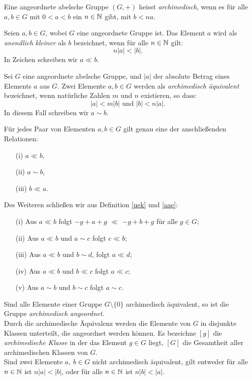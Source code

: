 %
\begin{defn}\label{archim}
Eine angeordnete abelsche Gruppe $\left(G,+\right)$ heisst \textit{archimedisch}, wenn es für alle $a, b \in G$  mit $0 < a < b$ ein $n \in \mathbb{N} $ gibt, mit $b < na$.
\end{defn}
%
%
\begin{defn}\label{uek}
Seien $a, b \in G$, wobei $G$ eine angeordnete Gruppe ist. Das Element $a$ wird als \textit{unendlich kleiner} als $b$ bezeichnet, wenn für alle $  n \in \mathbb{N} $ gilt: 
\[n|a| < |b|.\]
In Zeichen schreiben wir $a \ll b$.
\end{defn}
%
\begin{defn}\label{aae}
Sei $G$ eine angeordnete abelsche Gruppe, und $|a|$ der absolute Betrag eines Elements $a$ aus $G$. Zwei Elemente $a,b \in G$ werden als \textit{archimedisch äquivalent} bezeichnet, wenn natürliche Zahlen $m$ und $n$ existieren, so dass: 
\[|a| < m|b| \text{ und } |b| < n|a|.\]
In diesem Fall schreiben wir $ a \sim b $. 
\end{defn}
%
\begin{folg}
Für jedes Paar von Elementen $a, b \in G$ gilt genau eine der anschließenden Relationen: 
\begin{multicols}{3}
\begin{enumerate}
\item[(i)] $a \ll b$, 
\item[(ii)] $a \sim b$,
\item[(iii)] $b \ll a$. 
\end{enumerate}
\end{multicols}
%
Des Weiteren schließen wir aus Definition \ref{uek} und \ref{aae}:
\begin{enumerate}
\item[(i)] Aus $a \ll b$ folgt $-g+a+g $ $\ll$ $-g+b+g$ für alle $g \in G$;
\item[(ii)] Aus $a \ll b$ und $a \sim c$ folgt $c \ll b$;
\item[(iii)] Aus $a \ll b$ und $b \sim d$, folgt $a \ll d$;
\item[(iv)] Aus $a \ll b$ und $b \ll c$ folgt $a \ll c$;
\item[(v)] Aus $a \sim b$ und $b \sim c$ folgt $a \sim c$.
\end{enumerate}
Sind alle Elemente einer Gruppe $G\setminus\lbrace 0 \rbrace$ archimedisch äquivalent, so ist die Gruppe \textit{archimedisch angeordnet}. \\ 
Durch die archimedische Äquivalenz werden die Elemente von $G$ in disjunkte Klassen unterteilt, die angeordnet werden können. Es bezeichne $[g]$ die \textit{archimedische Klasse} in der das Element $g \in G$ liegt, $[G]$ die Gesamtheit aller archimedischen Klassen von $G$. \label{archimedischeKlassen}\\
Sind zwei Elemente $a,~b \in G$ nicht archimedisch äquivalent, gilt entweder für alle
$n \in \mathbb{N}$ ist $n|a|<|b|$, oder für alle $n \in \mathbb{N}$ ist $n|b| <|a|$.
\end{folg}
